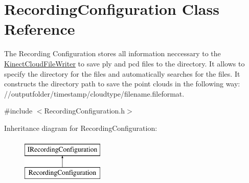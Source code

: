 \hypertarget{class_recording_configuration}{}\section{Recording\+Configuration Class Reference}
\label{class_recording_configuration}


The Recording Configuration stores all information neccessary to the \hyperlink{class_kinect_cloud_file_writer}{Kinect\+Cloud\+File\+Writer} to save ply and pcd files to the directory. It allows to specify the directory for the files and automatically searches for the files. It constructs the directory path to save the point clouds in the following way\+: //outputfolder/timestamp/cloudtype/filename.fileformat.  




{\ttfamily \#include $<$Recording\+Configuration.\+h$>$}

Inheritance diagram for Recording\+Configuration\+:\begin{figure}[H]
\begin{center}
\leavevmode
\includegraphics[height=2.000000cm]{class_recording_configuration}
\end{center}
\end{figure}
